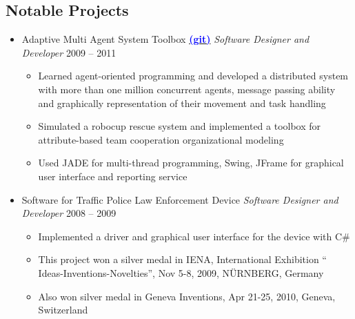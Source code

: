 \documentclass[letter]{res}
\begin{document}
\begin{resume}
		
		\section{Notable Projects}
		\begin{itemize}[leftmargin=-.1in]
			\item Adaptive Multi Agent System Toolbox {\href{https://github.com/omid55/team_based_rescue_jade_multi_agent_system}{\textbf{\textcolor{blue}{(git)}}}} \newline
			{\sl Software Designer and Developer} \hfill 2009 – 2011\\
			\vspace{-4mm}
			\iflong
			\begin{itemize}
				\item Learned agent-oriented programming and developed a distributed system with more than one million concurrent agents, message passing ability and graphically representation of their movement and task handling
				\item Simulated a robocup rescue system and implemented a toolbox for 				attribute-based team cooperation organizational modeling
				\item Used JADE for multi-thread programming, Swing, JFrame for graphical user interface and reporting service
			\end{itemize}
			\fi
			
			\item Software for Traffic Police Law Enforcement Device \newline
			{\sl Software Designer and Developer} \hfill 2008 – 2009\\
			\vspace{-4mm}
			\iflong
			\begin{itemize}
				\item Implemented a driver and graphical user interface for the device with C\#
				\item This project won a silver medal in IENA, International Exhibition `` Ideas-Inventions-Novelties'', Nov 5-8, 2009, N\"{U}RNBERG, Germany
				\item Also won silver medal in Geneva Inventions, Apr 21-25, 2010, Geneva, Switzerland
			\end{itemize}
			\fi
			

\end{itemize}
\end{resume}
\end{document}

